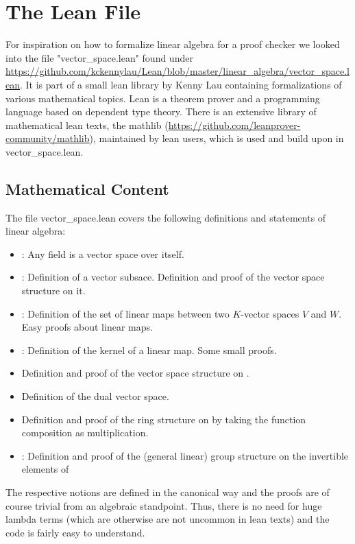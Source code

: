 \documentclass[11pt]{article}
\begin{document}
\newpage



\section{The Lean File}
For inspiration on how to formalize linear algebra for a proof checker we looked into the file "vector\_space.lean" found under \url{https://github.com/kckennylau/Lean/blob/master/linear_algebra/vector_space.lean}. It is part of a small lean library by Kenny Lau containing formalizations of various mathematical topics. Lean is a theorem prover and a programming language based on dependent type theory. There is an extensive library of mathematical lean texts, the mathlib (\url{https://github.com/leanprover-community/mathlib}), maintained by lean users, which is used and build upon in vector\_space.lean.



\subsection{Mathematical Content}
The file vector\_space.lean covers the following definitions and statements of linear algebra:
\begin{itemize}
\item {}: Any field is a vector space over itself.
\item {}: Definition of a vector subsace. Definition and proof of the vector space structure on it.
\item {}: Definition of the set of linear maps between two $K$-vector spaces $V$ and $W$. Easy proofs about linear maps.
\item {}: Definition of the kernel of a linear map. Some small proofs.
\item Definition and proof of the vector space structure on .
\item Definition of the dual vector space.
\item Definition and proof of the ring structure on  by taking the function composition as multiplication.
\item {}: Definition and proof of the (general linear) group structure on the invertible elements of 
\end{itemize}
The respective notions are defined in the canonical way and the proofs are of course trivial from an algebraic standpoint. Thus, there is no need for huge lambda terms (which are otherwise are not uncommon in lean texts) and the code is fairly easy to understand.
\end{document}
